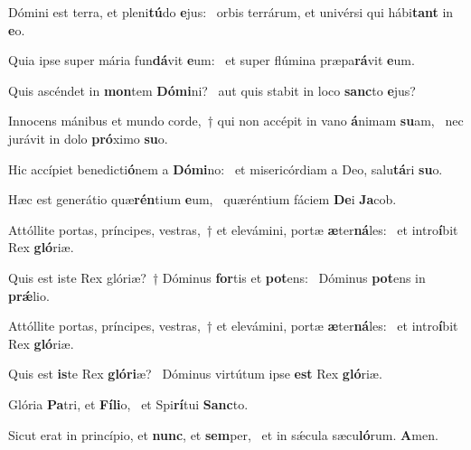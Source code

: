 \item Dómini est terra, et pleni\textbf{tú}do \textbf{e}jus:~\psstar{} orbis terrárum, et univérsi qui hábi\textbf{tant} in \textbf{e}o.
\item Quia ipse super mária fun\textbf{dá}vit \textbf{e}um:~\psstar{} et super flúmina præpa\textbf{rá}vit \textbf{e}um.
\item Quis ascéndet in \textbf{mon}tem \textbf{Dó}\textbf{mi}ni?~\psstar{} aut quis stabit in loco \textbf{sanc}to \textbf{e}jus?
\item Innocens mánibus et mundo corde,~† qui non accépit in vano \textbf{á}nimam \textbf{su}am,~\psstar{} nec jurávit in dolo \textbf{pró}ximo \textbf{su}o.
\item Hic accípiet benedicti\textbf{ó}nem a \textbf{Dó}\textbf{mi}no:~\psstar{} et misericórdiam a Deo, salu\textbf{tá}ri \textbf{su}o.
\item Hæc est generátio quæ\textbf{rén}tium \textbf{e}um,~\psstar{} quæréntium fáciem \textbf{De}i \textbf{Ja}cob.
\item Attóllite portas, príncipes, vestras,~† et elevámini, portæ \textbf{æ}ter\textbf{ná}les:~\psstar{} et intro\textbf{í}bit Rex \textbf{gló}riæ.
\item Quis est iste Rex glóriæ?~† Dóminus \textbf{for}tis et \textbf{pot}ens:~\psstar{} Dóminus \textbf{pot}ens in \textbf{prǽ}lio.
\item Attóllite portas, príncipes, vestras,~† et elevámini, portæ \textbf{æ}ter\textbf{ná}les:~\psstar{} et intro\textbf{í}bit Rex \textbf{gló}riæ.
\item Quis est \textbf{is}te Rex \textbf{gló}\textbf{ri}æ?~\psstar{} Dóminus virtútum ipse \textbf{est} Rex \textbf{gló}riæ.
\item Glória \textbf{Pa}tri, et \textbf{Fí}\textbf{li}o,~\psstar{} et Spi\textbf{rí}tui \textbf{Sanc}to.
\item Sicut erat in princípio, et \textbf{nunc}, et \textbf{sem}per,~\psstar{} et in sǽcula sæcu\textbf{ló}rum. \textbf{A}men.